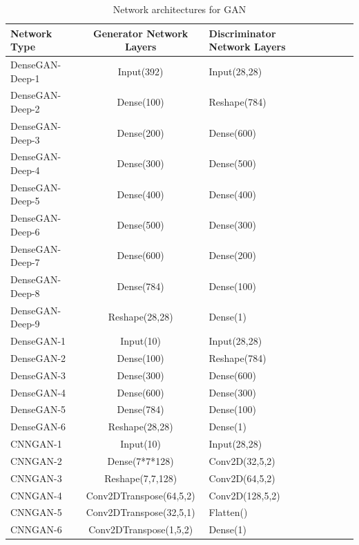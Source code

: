 \documentclass{article}
\begin{document}
	
	\begin{table}[t]
		\caption{Network architectures for GAN}
		\label{table:GANArchitecture}
		\centering
		\begin{tabular}{lclclcl}
			
			\toprule
			
			Network Type & Generator Network Layers & Discriminator Network Layers \\
			
			\midrule
			
			DenseGAN-Deep-1   & Input(392)     	        & Input(28,28)  \\
			DenseGAN-Deep-2   & Dense(100)    	        & Reshape(784)  \\
			DenseGAN-Deep-3   & Dense(200)     	        & Dense(600)  \\
			DenseGAN-Deep-4   & Dense(300)     	        & Dense(500)  \\
			DenseGAN-Deep-5   & Dense(400)     	        & Dense(400)  \\
			DenseGAN-Deep-6   & Dense(500)     	        & Dense(300)  \\
			DenseGAN-Deep-7   & Dense(600)     	        & Dense(200)  \\
			DenseGAN-Deep-8   & Dense(784)     	        & Dense(100)  \\
			DenseGAN-Deep-9   & Reshape(28,28)     	    & Dense(1)  \\
			
			\midrule
			
			DenseGAN-1   & Input(10)     	     & Input(28,28)  \\
			DenseGAN-2   & Dense(100)     	     & Reshape(784)  \\
			DenseGAN-3   & Dense(300)     	     & Dense(600)  \\		
			DenseGAN-4   & Dense(600)     	     & Dense(300)  \\		
			DenseGAN-5   & Dense(784)     	     & Dense(100)  \\
			DenseGAN-6   & Reshape(28,28)     	 & Dense(1)  \\
			
			\midrule
			
			CNNGAN-1   & Input(10)     	        		& Input(28,28)  \\
			CNNGAN-2   & Dense(7*7*128)     	        & Conv2D(32,5,2)  \\
			CNNGAN-3   & Reshape(7,7,128)     	        & Conv2D(64,5,2)  \\		
			CNNGAN-4   & Conv2DTranspose(64,5,2)     	& Conv2D(128,5,2)  \\		
			CNNGAN-5   & Conv2DTranspose(32,5,1)     	& Flatten()  \\
			CNNGAN-6   & Conv2DTranspose(1,5,2)     	& Dense(1)  \\		
			
			\bottomrule
		\end{tabular}
	\end{table}
\end{document}
